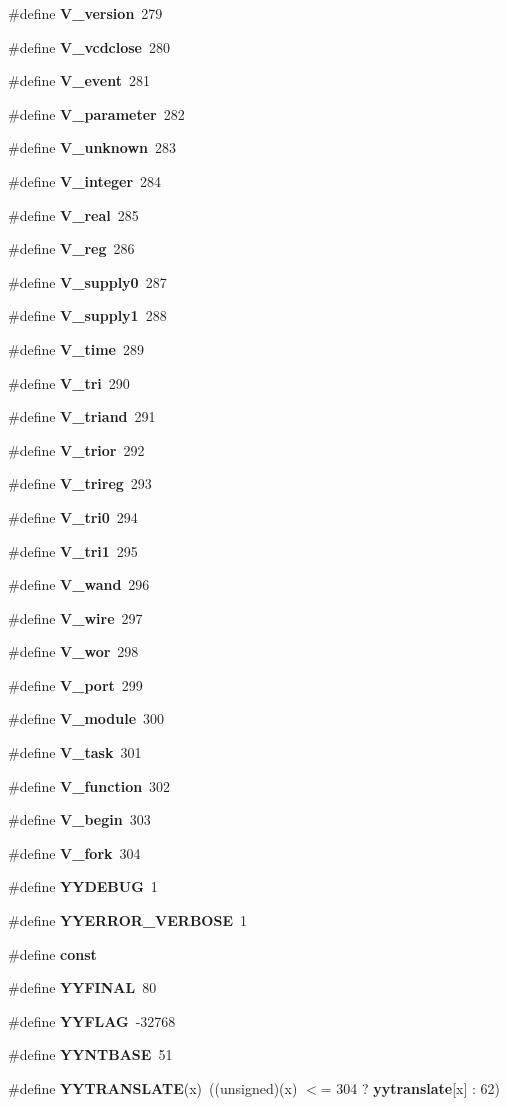 \begin{CompactItemize}
\item 
\#define {\bf V\_\-version}\ 279
\item 
\#define {\bf V\_\-vcdclose}\ 280
\item 
\#define {\bf V\_\-event}\ 281
\item 
\#define {\bf V\_\-parameter}\ 282
\item 
\#define {\bf V\_\-unknown}\ 283
\item 
\#define {\bf V\_\-integer}\ 284
\item 
\#define {\bf V\_\-real}\ 285
\item 
\#define {\bf V\_\-reg}\ 286
\item 
\#define {\bf V\_\-supply0}\ 287
\item 
\#define {\bf V\_\-supply1}\ 288
\item 
\#define {\bf V\_\-time}\ 289
\item 
\#define {\bf V\_\-tri}\ 290
\item 
\#define {\bf V\_\-triand}\ 291
\item 
\#define {\bf V\_\-trior}\ 292
\item 
\#define {\bf V\_\-trireg}\ 293
\item 
\#define {\bf V\_\-tri0}\ 294
\item 
\#define {\bf V\_\-tri1}\ 295
\item 
\#define {\bf V\_\-wand}\ 296
\item 
\#define {\bf V\_\-wire}\ 297
\item 
\#define {\bf V\_\-wor}\ 298
\item 
\#define {\bf V\_\-port}\ 299
\item 
\#define {\bf V\_\-module}\ 300
\item 
\#define {\bf V\_\-task}\ 301
\item 
\#define {\bf V\_\-function}\ 302
\item 
\#define {\bf V\_\-begin}\ 303
\item 
\#define {\bf V\_\-fork}\ 304
\item 
\#define {\bf YYDEBUG}\ 1
\item 
\#define {\bf YYERROR\_\-VERBOSE}\ 1
\item 
\#define {\bf const}
\item 
\#define {\bf YYFINAL}\ 80
\item 
\#define {\bf YYFLAG}\ -32768
\item 
\#define {\bf YYNTBASE}\ 51
\item 
\#define {\bf YYTRANSLATE}(x)\ ((unsigned)(x) $<$= 304 ? {\bf yytranslate}[x] : 62)

\end{CompactItemize}
